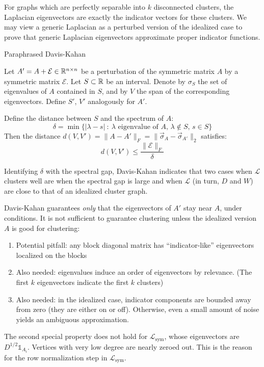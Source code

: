 \documentclass{article}
\begin{document}
For graphs which are perfectly separable into $k$ disconnected clusters, the Laplacian eigenvectors are exactly the indicator vectors for these clusters. We may view a generic Laplacian as a perturbed version of the idealized case to prove that generic Laplacian eigenvectors approximate proper indicator functions.

\begin{theorem}{Paraphrased Davis-Kahan}
 
Let $A' = A + \mathcal{E} \in {\mathbb R}^{n \times n}$ be a perturbation of the symmetric matrix $A$ by a symmetric matrix $\mathcal{E}$. Let $S \subset {\mathbb R}$ be an interval. Denote by $\sigma_{S}$ the set of eigenvalues of $A$ contained in $S$, and by $V$ the span of the corresponding eigenvectors. Define $S'$, $V'$ analogously for $A'$. 

Define the distance between $S$ and the spectrum of $A$:
\begin{equation}
    \delta = \min\{ |\lambda - s | \ : \  \text{$\lambda$ eigenvalue of $A$, $\lambda \not \in S$, $s \in S$} \}
\end{equation}
Then the distance $d(V, V') = \|A - A'\|_F = \|\vec{\sigma}_A - \vec{\sigma}_{A'} \|_2$ satisfies:
\begin{equation}
    d(V, V') \leq \frac{\|\mathcal{E}\|_F}{\delta}
\end{equation}
\end{theorem}
Identifying $\delta$ with the spectral gap, Davis-Kahan indicates that two cases when $\mathcal{L}$ clusters well are when the spectral gap is large and when $\mathcal{L}$ (in turn, $D$ and $W$) are close to that of an idealized cluster graph. 

Davis-Kahan guarantees \textit{only} that the eigenvectors of $A'$ stay near $A$, under conditions. It is not sufficient to guarantee clustering unless the idealized version $A$ is good for clustering:
\begin{enumerate}
    \item Potential pitfall: any block diagonal matrix has ``indicator-like'' eigenvectors localized on the blocks
    \item Also needed: eigenvalues induce an order of eigenvectors by relevance. (The first $k$ eigenvectors indicate the first $k$ clusters)
    \item Also needed: in the idealized case, indicator components are bounded away from zero (they are either on or off). Otherwise, even a small amount of noise yields an ambiguous approximation.
\end{enumerate}
The second special property does not hold for $\mathcal{L}_{\text{sym}}$, whose eigenvectors are $D^{1/2} \mathds{1}_{A_i}$. Vertices with very low degree are nearly zeroed out. This is the reason for the row normalization step in $\mathcal{L}_{\text{sym}}$.
\newpage

\end{document}
